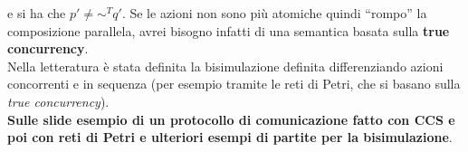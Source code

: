 e si ha che $p'\neq\sim^Tq'$. Se le azioni non sono più atomiche quindi
``rompo'' la composizione parallela, avrei bisogno infatti di una semantica
basata sulla \textbf{true concurrency}.\\
Nella letteratura è stata definita la bisimulazione definita differenziando
azioni concorrenti e in sequenza (per esempio tramite le reti di Petri, che si
basano sulla \textit{true concurrency}).\\
\textbf{Sulle slide esempio di un protocollo di comunicazione fatto con CCS e
  poi con reti di Petri e ulteriori esempi di partite per la bisimulazione}.